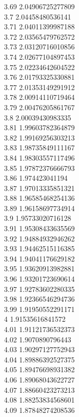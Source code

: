 {3.69	2.04906725277809\\
3.7	2.04458480536141\\
3.71	2.04011399987188\\
3.72	2.03565479762572\\
3.73	2.03120716010856\\
3.74	2.02677104897453\\
3.75	2.02234642604522\\
3.76	2.01793325330881\\
3.77	2.01353149291912\\
3.78	2.00914110719464\\
3.79	2.00476205861767\\
3.8	2.00039430983335\\
3.81	1.99603782364879\\
3.82	1.99169256303213\\
3.83	1.98735849111167\\
3.84	1.98303557117496\\
3.85	1.97872376666793\\
3.86	1.974423041194\\
3.87	1.97013335851321\\
3.88	1.96585468254136\\
3.89	1.96158697734914\\
3.9	1.95733020716128\\
3.91	1.95308433635569\\
3.92	1.94884932946262\\
3.93	1.94462515116385\\
3.94	1.94041176629182\\
3.95	1.93620913982881\\
3.96	1.93201723690614\\
3.97	1.92783602280335\\
3.98	1.92366546294736\\
3.99	1.91950552291171\\
4	1.91535616841572\\
4.01	1.91121736532373\\
4.02	1.9070890796443\\
4.03	1.90297127752943\\
4.04	1.89886392527375\\
4.05	1.89476698931382\\
4.06	1.89068043622727\\
4.07	1.88660423273213\\
4.08	1.88253834568601\\
4.09	1.87848274208536\\
}
